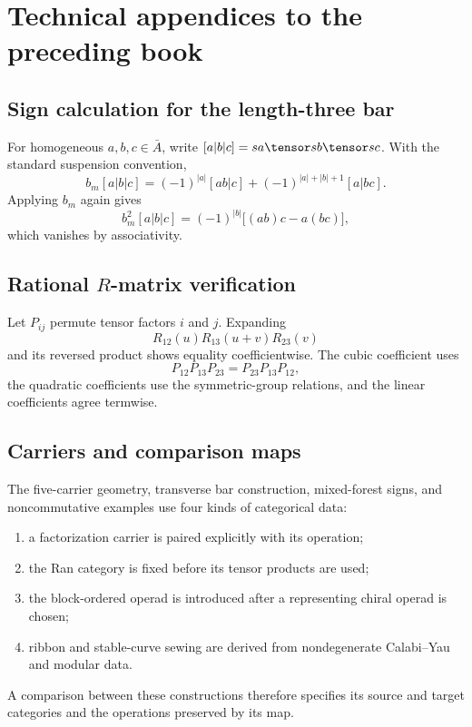 \part{Technical appendices to the preceding book}
\chapter{Sign calculation for the length-three bar}
For homogeneous $a,b,c\in\bar A$, write $[a|b|c]=sa\tensor sb\tensor sc$. With the standard suspension convention,
\[
 b_m[a|b|c]
 =(-1)^{|a|}[ab|c]
 +(-1)^{|a|+|b|+1}[a|bc].
\]
Applying $b_m$ again gives
\[
 b_m^2[a|b|c]
 =(-1)^{|b|}\bigl[(ab)c-a(bc)\bigr],
\]
which vanishes by associativity.

\chapter{Rational \texorpdfstring{$R$}{R}-matrix verification}
Let $P_{ij}$ permute tensor factors $i$ and $j$. Expanding
\[
 R_{12}(u)R_{13}(u+v)R_{23}(v)
\]
and its reversed product shows equality coefficientwise. The cubic coefficient uses
\[
 P_{12}P_{13}P_{23}=P_{23}P_{13}P_{12},
\]
the quadratic coefficients use the symmetric-group relations, and the linear coefficients agree termwise.

\chapter{Carriers and comparison maps}
The five-carrier geometry, transverse bar construction, mixed-forest signs, and noncommutative examples use four kinds of categorical data:
\begin{enumerate}
\item a factorization carrier is paired explicitly with its operation;
\item the Ran category is fixed before its tensor products are used;
\item the block-ordered operad is introduced after a representing chiral operad is chosen;
\item ribbon and stable-curve sewing are derived from nondegenerate Calabi--Yau and modular data.
\end{enumerate}
A comparison between these constructions therefore specifies its source and target categories and the operations preserved by its map.
